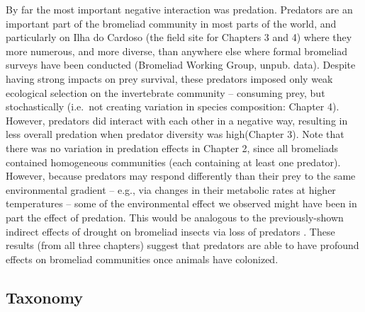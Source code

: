 By far the most important negative interaction was predation. Predators
are an important part of the bromeliad community in most parts of the
world, and particularly on Ilha do Cardoso (the field site for Chapters
3 and 4) where they more numerous, and more diverse, than anywhere else
where formal bromeliad surveys have been conducted (Bromeliad Working
Group, unpub. data). Despite having strong impacts on prey survival,
these predators imposed only weak ecological selection on the
invertebrate community -- consuming prey, but stochastically (i.e.~not
creating variation in species composition: Chapter 4). However,
predators did interact with each other in a negative way, resulting in
less overall predation when predator diversity was high(Chapter 3). Note
that there was no variation in predation effects in Chapter 2, since all
bromeliads contained homogeneous communities (each containing at least
one predator). However, because predators may respond differently than
their prey to the same environmental gradient -- e.g., via changes in
their metabolic rates at higher temperatures -- some of the
environmental effect we observed might have been in part the effect of
predation. This would be analogous to the previously-shown indirect
effects of drought on bromeliad insects via loss of predators
\citep{amundrud}. These results (from all three chapters) suggest that
predators are able to have profound effects on bromeliad communities
once animals have colonized.

\subsection{Taxonomy}\label{taxonomy}


